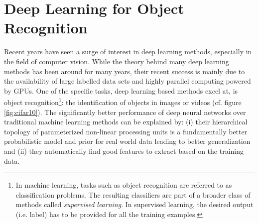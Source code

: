 \section{Deep Learning for Object Recognition}
Recent years have seen a surge of interest in deep learning methods, especially in the field of computer vision. While the theory behind many deep learning methods has been around for many years, their recent success is mainly due to the availability of large labelled data sets and highly parallel computing powered by GPUs. One of the specific tasks, deep learning based methods excel at, is object recognition\footnote{In machine learning, tasks such as object recognition are referred to as classification problems. The resulting classifiers are part of a broader class of methods called \emph{supervised learning}. In supervised learning, the desired output (i.e. label) has to be provided for all the training examples.}: the identification of objects in images or videos (cf. figure \ref{fig:cifar10}). The significantly better performance of deep neural networks over traditional machine learning methods can be explained by: (i) their hierarchical topology of parameterized non-linear processing units is a fundamentally better probabilistic model and prior for real world data leading to better generalization and (ii) they automatically find good features to extract based on the training data.

